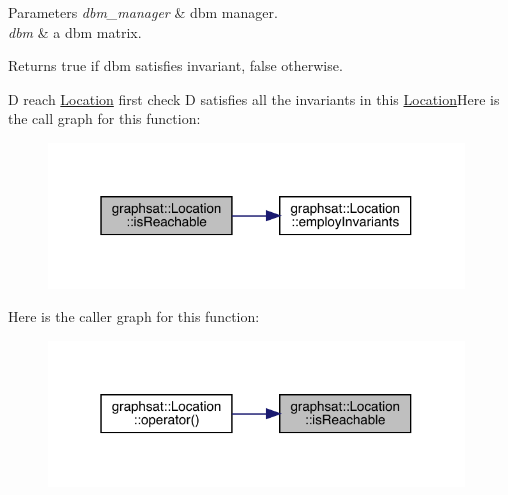 \begin{DoxyParams}{Parameters}
{\em dbm\+\_\+manager} & dbm manager. \\
\hline
{\em dbm} & a dbm matrix.\\
\hline
\end{DoxyParams}
\begin{DoxyReturn}{Returns}
true if dbm satisfies invariant, false otherwise. 
\end{DoxyReturn}
D reach \mbox{\hyperlink{classgraphsat_1_1_location}{Location}} first check D satisfies all the invariants in this \mbox{\hyperlink{classgraphsat_1_1_location}{Location}}Here is the call graph for this function\+:
\nopagebreak
\begin{figure}[H]
\begin{center}
\leavevmode
\includegraphics[width=313pt]{classgraphsat_1_1_location_a5cb2c4a3420724f44a1c942d2d6ca213_cgraph}
\end{center}
\end{figure}
Here is the caller graph for this function\+:
\nopagebreak
\begin{figure}[H]
\begin{center}
\leavevmode
\includegraphics[width=313pt]{classgraphsat_1_1_location_a5cb2c4a3420724f44a1c942d2d6ca213_icgraph}
\end{center}
\end{figure}
\mbox{\label{classgraphsat_1_1_location_a446eebc27230db6d46e952d912d8a9c1}} 
